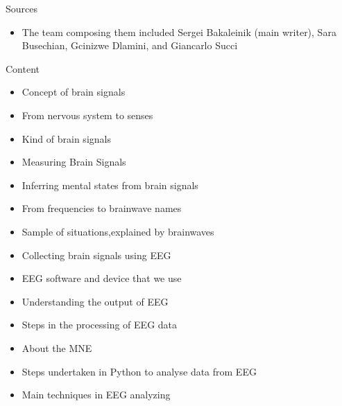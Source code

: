 \documentclass{beamer}
\begin{document}
\begin{frame}
{\centerline{Sources}}
\begin{itemize}
\begin{itemize}
    \item W. Klimesch, M. Doppelmayr, T. Pachinger, and B. Ripper, ``Brain oscillations  and  human  memory:  EEG  correlates  in  the  upper  alpha  and  theta band,'' Neuroscience letters, vol. 238, no. 1-2, pp. 9–12, 1997.
    \item  I. Crk, T. Kluthe, and A. Stefik ``Understanding programming expertise:An empirical study of phasic brain wave changes,''  ACM Transactions on Computer-Human Interaction (TOCHI), vol. 23, no. 1, pp. 1–29, 2015
    \item \href{https://en.wikipedia.org/wiki/10\%5C\%E2\%5C\%80\%5C\%9320_system_(EEG).}{Wikipedia} - 10–20  system  (EEG)
\end{itemize}
\item The team composing them included Sergei Bakaleinik (main writer), Sara Busechian, Gcinizwe Dlamini, and Giancarlo Succi
\end{itemize}

\end{frame}


\begin{frame}
{\centerline{Content}}
\begin{itemize}
    \item Concept of brain signals
    \item From nervous system to senses
    \item Kind of brain signals
    \item Measuring Brain Signals
    \item Inferring mental states from brain signals
    \item From frequencies to brainwave names
    \item Sample of situations,explained by brainwaves
    \item Collecting brain signals using EEG
    \item EEG software and device that we use
    \item Understanding the output of EEG
    \item Steps in the processing of EEG data
    \item About the MNE
    \item Steps undertaken in Python to analyse data from EEG
    \item Main techniques in EEG analyzing
\end{itemize}
\end{frame}
\end{document}
